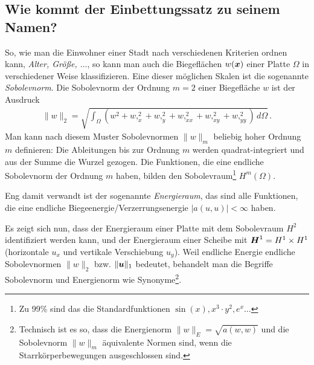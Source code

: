 \textcolor{sectionTitleBlue}{\subsection{Wie kommt der Einbettungssatz zu seinem Namen?}}
So, wie man die Einwohner einer Stadt nach verschiedenen Kriterien ordnen kann, {\em Alter, Gr\"{o}{\ss}e, $\ldots$\/}, so kann man auch die Biegefl\"{a}chen $w(\mbox{\boldmath $x$})$ einer Platte $\Omega$ in verschiedener Weise klassifizieren. Eine dieser m\"{o}glichen Skalen ist die sogenannte {\em Sobolevnorm\/}. Die Sobolevnorm der Ordnung $m = 2$ einer Biegefl\"{a}che $w$ ist der Ausdruck
\begin{align}\label{Eq71}
\|w\|_2 = \sqrt{\int_{\Omega} (w^2 + w,_x^2 + w,_y^2 + w,_{xx}^2 + w,_{xy}^2 + w,_{yy}^2) \,d\Omega}\,.
\end{align}
Man kann nach diesem Muster Sobolevnormen $\|w\|_m$ beliebig hoher Ordnung $m$ definieren: Die Ableitungen bis zur Ordnung $m$ werden quadrat-integriert und aus der Summe die Wurzel gezogen.
Die Funktionen, die eine endliche Sobolevnorm der Ordnung $m$ haben, bilden den Sobolevraum\footnote{Zu 99\% sind das die Standardfunktionen $\sin(x), x^3\cdot  y^2, e^x  \ldots$} $H^m(\Omega)$.

Eng damit verwandt ist der sogenannte {\em Energieraum\/}, das sind alle Funktionen, die eine endliche Biegeenergie/Verzerrungsenergie $|a(u,u)| < \infty$ haben.

Es zeigt sich nun, dass der Energieraum einer Platte mit dem Sobolevraum $H^2$ identifiziert werden kann, und der Energieraum einer Scheibe mit $\mbox{\boldmath $H$}^1 = H^1 \times H^1$ (horizontale $u_x$ und vertikale Verschiebung $u_y$). Weil endliche Energie endliche Sobolevnormen $\|w\|_2$ bzw. $\|\mbox{\boldmath $u$}\|_1$ bedeutet, behandelt man die Begriffe Sobolevnorm und Energienorm wie Synonyme\footnote{Technisch ist es so, dass die Energienorm $\|w\|_E = \sqrt{a(w,w)}$ und die Sobolevnorm $\|w\|_m$ \"{a}quivalente Normen sind, wenn die Starrk\"{o}rperbewegungen ausgeschlossen sind.}.


